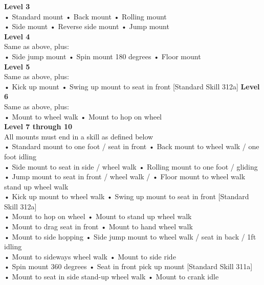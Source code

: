 \textbf{Level 3}\\
• Standard mount • Back mount • Rolling mount\\
• Side mount • Reverse side mount • Jump mount\\
\textbf{Level 4} \\
Same as above, plus:\\
• Side jump mount • Spin mount 180 degrees • Floor mount\\
\textbf{Level 5} \\
Same as above, plus:\\
• Kick up mount • Swing up mount to seat in front [Standard Skill 312a]
\textbf{Level 6}\\
Same as above, plus:\\
• Mount to wheel walk • Mount to hop on wheel  \\
\textbf{Level 7 through 10}\\
All mounts must end in a skill as defined below\\
• Standard mount to one foot / seat in front • Back mount to wheel walk / one foot idling\\
• Side mount to seat in side / wheel walk • Rolling mount to one foot / gliding\\
• Jump mount to seat in front / wheel walk /
• Floor mount to wheel walk
 stand up wheel walk\\
• Kick up mount to wheel walk
• Swing up mount to seat in front [Standard Skill 312a]\\
• Mount to hop on wheel
• Mount to stand up wheel walk\\
• Mount to drag seat in front
• Mount to hand wheel walk\\
• Mount to side hopping
• Side jump mount to wheel walk / seat in back / 1ft idling\\
• Mount to sideways wheel walk
• Mount to side ride\\
• Spin mount 360 degrees
• Seat in front pick up mount [Standard Skill 311a]\\
• Mount to seat in side stand-up wheel walk
• Mount to crank idle\\

\newpage



